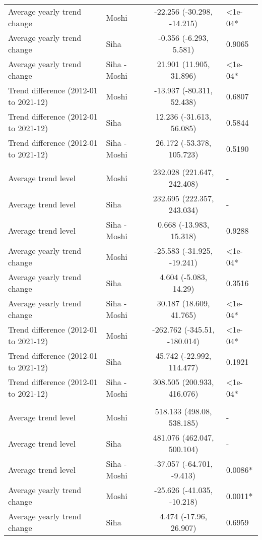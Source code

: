 \begin{longtable}{l|lcl}
Average yearly trend change & Moshi & -22.256 (-30.298, -14.215) & <1e-04* \\ 
Average yearly trend change & Siha & -0.356 (-6.293, 5.581) & 0.9065 \\ 
Average yearly trend change & Siha - Moshi & 21.901 (11.905, 31.896) & <1e-04* \\ 
Trend difference (2012-01 to 2021-12) & Moshi & -13.937 (-80.311, 52.438) & 0.6807 \\ 
Trend difference (2012-01 to 2021-12) & Siha & 12.236 (-31.613, 56.085) & 0.5844 \\ 
Trend difference (2012-01 to 2021-12) & Siha - Moshi & 26.172 (-53.378, 105.723) & 0.5190 \\ 
\midrule\addlinespace[2.5pt]
\multicolumn{4}{l}{Other Communicable Diseases} \\[2.5pt] 
\midrule\addlinespace[2.5pt]
Average trend level & Moshi & 232.028 (221.647, 242.408) & - \\ 
Average trend level & Siha & 232.695 (222.357, 243.034) & - \\ 
Average trend level & Siha - Moshi & 0.668 (-13.983, 15.318) & 0.9288 \\ 
Average yearly trend change & Moshi & -25.583 (-31.925, -19.241) & <1e-04* \\ 
Average yearly trend change & Siha & 4.604 (-5.083, 14.29) & 0.3516 \\ 
Average yearly trend change & Siha - Moshi & 30.187 (18.609, 41.765) & <1e-04* \\ 
Trend difference (2012-01 to 2021-12) & Moshi & -262.762 (-345.51, -180.014) & <1e-04* \\ 
Trend difference (2012-01 to 2021-12) & Siha & 45.742 (-22.992, 114.477) & 0.1921 \\ 
Trend difference (2012-01 to 2021-12) & Siha - Moshi & 308.505 (200.933, 416.076) & <1e-04* \\ 
\midrule\addlinespace[2.5pt]
\multicolumn{4}{l}{Other Non-Communicable} \\[2.5pt] 
\midrule\addlinespace[2.5pt]
Average trend level & Moshi & 518.133 (498.08, 538.185) & - \\ 
Average trend level & Siha & 481.076 (462.047, 500.104) & - \\ 
Average trend level & Siha - Moshi & -37.057 (-64.701, -9.413) & 0.0086* \\ 
Average yearly trend change & Moshi & -25.626 (-41.035, -10.218) & 0.0011* \\ 
Average yearly trend change & Siha & 4.474 (-17.96, 26.907) & 0.6959 \\ 

\end{longtable}
